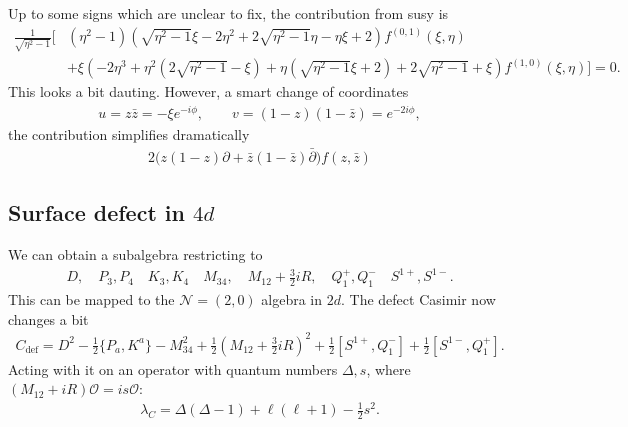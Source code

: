 \documentclass[letterpaper]{article}
\let\Oldsubsection\subsection
\renewcommand{\subsection}{\FloatBarrier\Oldsubsection}
\def\Nm{{\mathcal{N}}}
\def\Om{{\mathcal{O}}}
\newcommand\zb{{\bar z}}
\begin{document}
Up to some signs which are unclear to fix, the contribution from susy is
\begin{align}
 \frac{1}{\sqrt{\eta ^2-1}} \Big[ 
& \left(\eta ^2-1\right) \left(\sqrt{\eta ^2-1} \xi -2 \eta ^2+2 \sqrt{\eta ^2-1} \eta -\eta  \xi +2\right) f^{(0,1)}(\xi ,\eta ) \\
& +\xi  \left(-2 \eta ^3+\eta ^2 \left(2 \sqrt{\eta ^2-1}-\xi \right)+\eta  \left(\sqrt{\eta ^2-1} \xi +2\right)+2 \sqrt{\eta ^2-1}+\xi \right) f^{(1,0)}(\xi ,\eta )
 \Big] = 0.
\end{align}
This looks a bit dauting. However, a smart change of coordinates
\begin{align}
 u = z \zb = - \xi e^{-i\phi}, \qquad
 v = (1-z)(1-\zb) = e^{-2i\phi},
\end{align}
the contribution simplifies dramatically
\begin{align}
 2 \Big( z(1-z) \partial + \zb(1-\zb) \bar \partial \Big) f(z, \zb) 
\end{align}

\subsection{Surface defect in \texorpdfstring{$4d$}{4d}}

We can obtain a subalgebra restricting to
\begin{align}
 D, \quad
 P_3, P_4 \quad
 K_3, K_4 \quad
 M_{34}, \quad
 M_{12} + \frac{3}{2}iR, \quad
 Q^+_1, Q^-_1 \quad
 S^{1+}, S^{1-}.
\end{align}
This can be mapped to the $\Nm = (2, 0)$ algebra in $2d$.
The defect Casimir now changes a bit
\begin{align}
 C_{\text{def}} = 
    D^2
  - \frac12 \{ P_a, K^a \}
  - M_{34}^2
  + \frac12 \left( M_{12} + \frac{3}{2}iR \right)^2
  + \frac12 [ S^{1+}, Q^-_1]
  + \frac12 [ S^{1-}, Q^+_1].
\end{align}
Acting with it on an operator with quantum numbers $\Delta, s$, where $(M_{12}+iR)\Om = i s \Om$:
\begin{align}
 \lambda_C 
 = \Delta(\Delta-1)
 + \ell(\ell+1)
 - \frac12 s^2.
\end{align}
\end{document}
